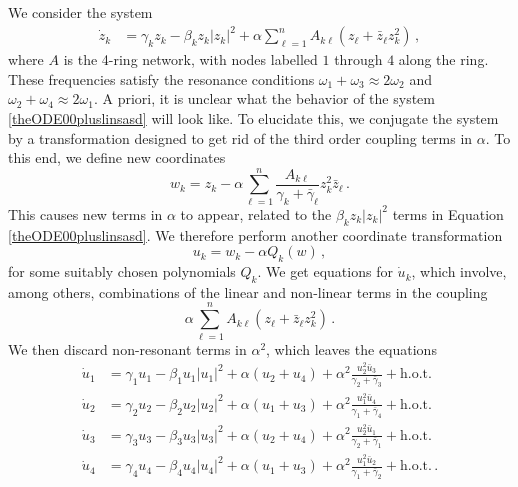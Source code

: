 \documentclass[12pt]{article}
\theoremstyle{plain}
\theoremstyle{definition}
\theoremstyle{remark}
\theoremstyle{remark}
\begin{document}
{We consider the system
\begin{align}\label{theODE00pluslinsasd}
\dot{z}_k &= \gamma_kz_k - \beta_k z_k|z_k|^2 + \alpha \sum_{\ell =1}^n A_{k\ell}(z_{\ell} + \bar{z}_{\ell}z_k^2)\, ,
\end{align}
where $A$ is the 4-ring network, with nodes labelled $1$ through $4$ along the ring. These frequencies satisfy the resonance conditions $\omega_1 + \omega_3 \approx 2\omega_2$ and $\omega_2 + \omega_4 \approx 2\omega_1$. A priori, it is unclear what the behavior of the system \eqref{theODE00pluslinsasd} will look like. To elucidate this, we conjugate the system by a transformation designed to get rid of the third order coupling terms in $\alpha$. To this end, we define new coordinates
 \begin{equation}
w_k = z_k - \alpha \sum_{\ell =1}^n \frac{A_{k\ell}}{\gamma_k + \bar{\gamma}_{\ell}}z_k^2\bar{z}_{\ell} \, .
 \end{equation}
 This causes new terms in $\alpha$ to appear, related to the $\beta_k z_k|z_k|^2$ terms in Equation \eqref{theODE00pluslinsasd}. We therefore perform another coordinate transformation
  \begin{equation}
u_k = w_k - \alpha Q_k(w) \, ,
 \end{equation}
 for some suitably chosen polynomials $Q_k$. We get equations for $\dot{u}_k$, which involve, among others, combinations of the linear and non-linear terms in the coupling 
 \begin{equation}
  \alpha \sum_{\ell =1}^n A_{k \ell}(z_{\ell} + \bar{z}_{\ell}z_k^2)\, .
 \end{equation}
We then discard non-resonant terms in $\alpha^2$, which leaves the equations 
\begin{align}\label{RedZ}
\dot{u}_1 &= \gamma_1u_1 - \beta_1 u_1|u_1|^2 + \alpha(u_2 + u_4) + \alpha^2\frac{u_{2}^2\bar{u}_{3}}{\gamma_{2} + \bar{\gamma}_3} + \text{h.o.t.}\\ \nonumber
\dot{u}_2 &= \gamma_2u_2 - \beta_2 u_2|u_2|^2 + \alpha(u_1 + u_3) + \alpha^2\frac{u_{1}^2\bar{u}_{4}}{\gamma_{1} + \bar{\gamma}_4} + \text{h.o.t.}\\ \nonumber
\dot{u}_3 &= \gamma_3u_3 - \beta_3 u_3|u_3|^2 + \alpha(u_2 + u_4) + \alpha^2\frac{u_{2}^2\bar{u}_{1}}{\gamma_{2} + \bar{\gamma}_1} + \text{h.o.t.}\\ \nonumber
\dot{u}_4 &= \gamma_4u_4 - \beta_4 u_4|u_4|^2 + \alpha(u_1 + u_3) + \alpha^2\frac{u_{1}^2\bar{u}_{2}}{\gamma_{1} + \bar{\gamma}_2}+ \text{h.o.t.}\, .
\end{align}
}
\end{document}
